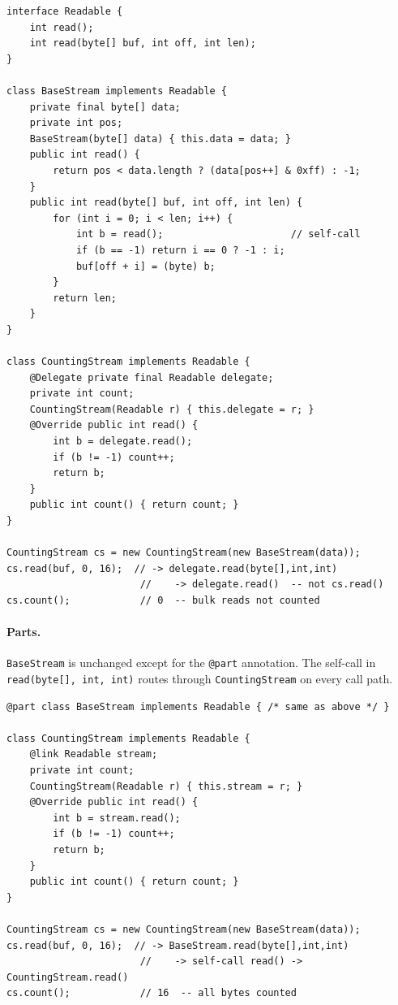 \documentclass[sigplan,10pt,review,anonymous]{acmart}
\theoremstyle{acmplain}
\newcommand{\code}[1]{\texttt{#1}}
\begin{document}
\begin{lstlisting}
interface Readable {
    int read();
    int read(byte[] buf, int off, int len);
}

class BaseStream implements Readable {
    private final byte[] data;
    private int pos;
    BaseStream(byte[] data) { this.data = data; }
    public int read() {
        return pos < data.length ? (data[pos++] & 0xff) : -1;
    }
    public int read(byte[] buf, int off, int len) {
        for (int i = 0; i < len; i++) {
            int b = read();                      // self-call
            if (b == -1) return i == 0 ? -1 : i;
            buf[off + i] = (byte) b;
        }
        return len;
    }
}

class CountingStream implements Readable {
    @Delegate private final Readable delegate;
    private int count;
    CountingStream(Readable r) { this.delegate = r; }
    @Override public int read() {
        int b = delegate.read();
        if (b != -1) count++;
        return b;
    }
    public int count() { return count; }
}

CountingStream cs = new CountingStream(new BaseStream(data));
cs.read(buf, 0, 16);  // -> delegate.read(byte[],int,int)
                       //    -> delegate.read()  -- not cs.read()
cs.count();            // 0  -- bulk reads not counted
\end{lstlisting}

\paragraph{Parts.}
\code{BaseStream} is unchanged except for the \code{@part} annotation. The
self-call in \code{read(byte[], int, int)} routes through \code{CountingStream}
on every call path.

\begin{lstlisting}
@part class BaseStream implements Readable { /* same as above */ }

class CountingStream implements Readable {
    @link Readable stream;
    private int count;
    CountingStream(Readable r) { this.stream = r; }
    @Override public int read() {
        int b = stream.read();
        if (b != -1) count++;
        return b;
    }
    public int count() { return count; }
}

CountingStream cs = new CountingStream(new BaseStream(data));
cs.read(buf, 0, 16);  // -> BaseStream.read(byte[],int,int)
                       //    -> self-call read() -> CountingStream.read()
cs.count();            // 16  -- all bytes counted
\end{lstlisting}
\end{document}
